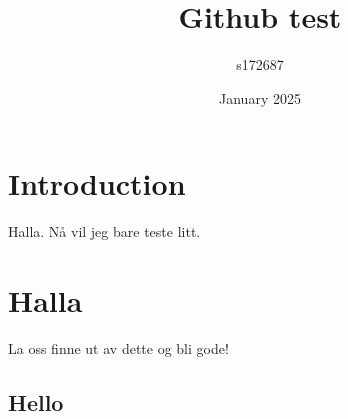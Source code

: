 \documentclass{article}
\title{Github test}
\author{s172687 }
\date{January 2025}
\begin{document}
\maketitle

\section{Introduction}
Halla. Nå vil jeg bare teste litt.
\section{Halla}
La oss finne ut av dette og bli gode!


\subsection{Hello}
\end{document}
